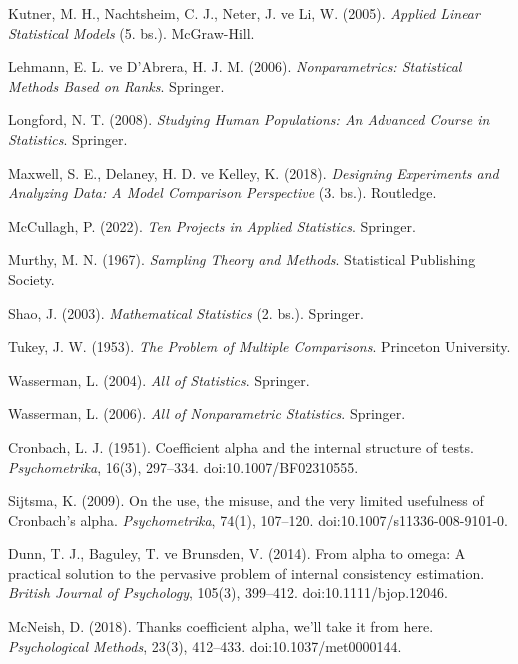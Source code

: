  Kutner, M. H., Nachtsheim, C. J., Neter, J. ve Li, W. (2005). \textit{Applied Linear Statistical Models} (5. bs.). McGraw-Hill.

 Lehmann, E. L. ve D'Abrera, H. J. M. (2006). \textit{Nonparametrics: Statistical Methods Based on Ranks}. Springer.

 Longford, N. T. (2008). \textit{Studying Human Populations: An Advanced Course in Statistics}. Springer.

 Maxwell, S. E., Delaney, H. D. ve Kelley, K. (2018). \textit{Designing Experiments and Analyzing Data: A Model Comparison Perspective} (3. bs.). Routledge.

 McCullagh, P. (2022). \textit{Ten Projects in Applied Statistics}. Springer.

 Murthy, M. N. (1967). \textit{Sampling Theory and Methods}. Statistical Publishing Society.

 Shao, J. (2003). \textit{Mathematical Statistics} (2. bs.). Springer.

 Tukey, J. W. (1953). \textit{The Problem of Multiple Comparisons}. Princeton University.

 Wasserman, L. (2004). \textit{All of Statistics}. Springer.

 Wasserman, L. (2006). \textit{All of Nonparametric Statistics}. Springer.

Cronbach, L. J. (1951). Coefficient alpha and the internal structure of tests.
\textit{Psychometrika}, 16(3), 297--334.
doi:10.1007/BF02310555.

Sijtsma, K. (2009). On the use, the misuse, and the very limited usefulness
of Cronbach's alpha. \textit{Psychometrika}, 74(1), 107--120.
doi:10.1007/s11336-008-9101-0.

Dunn, T. J., Baguley, T. ve Brunsden, V. (2014). From alpha to omega: A
practical solution to the pervasive problem of internal consistency
estimation. \textit{British Journal of Psychology}, 105(3), 399--412.
doi:10.1111/bjop.12046.

McNeish, D. (2018). Thanks coefficient alpha, we'll take it from here.
\textit{Psychological Methods}, 23(3), 412--433.
doi:10.1037/met0000144.
